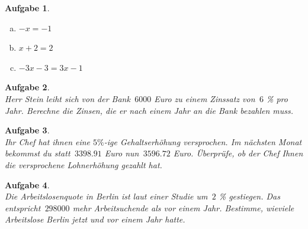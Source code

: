 \documentclass[12pt,fleqn]{article}
\theoremstyle{aufg}
\newtheorem{aufgabe}{Aufgabe}
\theoremstyle{bsp}
\begin{document}
\begin{flushleft}
\begin{aufgabe}
\begin{multicols}{3}
\begin{enumerate}[a)]
\item 
$- x = -1$
\item 
$x + 2 = 2$
\item 
$- 3 x - 3 = 3 x - 1$
\end{enumerate} 
\end{multicols} 
\end{aufgabe} 
\begin{aufgabe} ~ \\ 
Herr Stein leiht sich von der Bank $\mathrm{\,6000}$ Euro zu einem Zinssatz von $\mathrm{\,6}$ \% pro Jahr. Berechne die Zinsen, die er nach einem Jahr an die Bank bezahlen muss.
\end{aufgabe} 
\begin{aufgabe} ~ \\ 
Ihr Chef hat ihnen eine $5\%$-ige Gehaltserh\"ohung versprochen. Im n\"achsten Monat bekommst du statt $\mathrm{\,3398.91}$ Euro nun $\mathrm{\,3596.72}$ Euro. \"Uberpr\"ufe, ob der Chef Ihnen die versprochene Lohnerh\"ohung gezahlt hat. 
\end{aufgabe} 
\begin{aufgabe} ~ \\ 
Die Arbeitslosenquote in Berlin ist laut einer Studie um $\mathrm{\,2}$ \% gestiegen. Das entspricht $\mathrm{\,298000}$ mehr Arbeitsuchende als vor einem Jahr. Bestimme, wieviele Arbeitslose Berlin jetzt und vor einem Jahr hatte.  
\end{aufgabe} 
\end{flushleft} 
    
\end{document}
